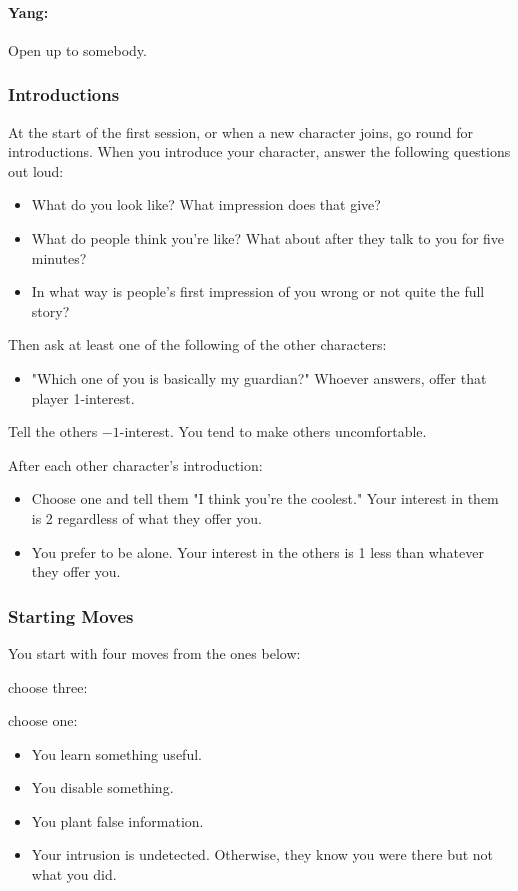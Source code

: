 \paragraph{Yang:} Open up to somebody.

\subsubsection{Introductions}
At the start of the first session, or when a new character joins, go round for introductions.
When you introduce your character, answer the following questions out loud:
\begin{itemize}
\item What do you look like? What impression does that give?
\item What do people think you're like? What about after they talk to you for five minutes?
\item In what way is people's first impression of you wrong or not quite the full story?
\end{itemize}

Then ask at least one of the following of the other characters:
\begin{itemize}
\item "Which one of you is basically my guardian?" Whoever answers, offer that player 1-interest.
\end{itemize}
Tell the others $-1$-interest. You tend to make others uncomfortable.

After each other character's introduction:
\begin{itemize}
\item Choose one and tell them "I think you're the coolest." Your interest in them is 2 regardless of what they offer you.
\item You prefer to be alone. Your interest in the others is 1 less than whatever they offer you.
\end{itemize}

\subsubsection{Starting Moves}
You start with four moves from the ones below:

{choose three:}
{choose one:
\begin{itemize}
\item You learn something useful.
\item You disable something.
\item You plant false information.
\item Your intrusion is undetected. Otherwise, they know you were there but not what you did.
\end{itemize}}

